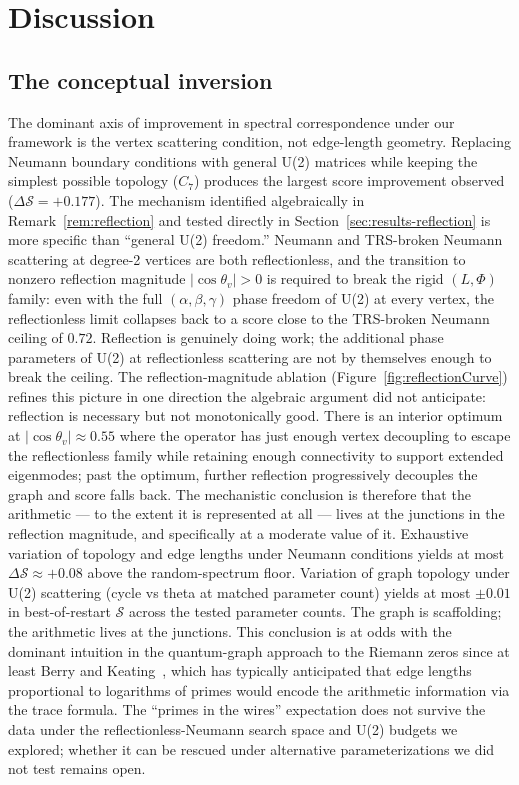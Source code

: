 \documentclass[cntp]{ipart}
\theoremstyle{plain}
\theoremstyle{remark}
\begin{document}
\section{Discussion}
\label{sec:discussion}

\subsection{The conceptual inversion}
\label{sec:disc-inversion}

The dominant axis of improvement in spectral correspondence under our framework is the vertex scattering condition, not edge-length geometry. Replacing Neumann boundary conditions with general U(2) matrices while keeping the simplest possible topology ($C_7$) produces the largest score improvement observed ($\Delta\mathcal{S} = +0.177$). The mechanism identified algebraically in Remark~\ref{rem:reflection} and tested directly in Section~\ref{sec:results-reflection} is more specific than ``general U(2) freedom.'' Neumann and TRS-broken Neumann scattering at degree-2 vertices are both reflectionless, and the transition to nonzero reflection magnitude $|\cos\theta_v| > 0$ is required to break the rigid $(L, \Phi)$ family: even with the full $(\alpha, \beta, \gamma)$ phase freedom of U(2) at every vertex, the reflectionless limit collapses back to a score close to the TRS-broken Neumann ceiling of $0.72$. Reflection is genuinely doing work; the additional phase parameters of U(2) at reflectionless scattering are not by themselves enough to break the ceiling. The reflection-magnitude ablation (Figure~\ref{fig:reflectionCurve}) refines this picture in one direction the algebraic argument did not anticipate: reflection is necessary but not monotonically good. There is an interior optimum at $|\cos\theta_v| \approx 0.55$ where the operator has just enough vertex decoupling to escape the reflectionless family while retaining enough connectivity to support extended eigenmodes; past the optimum, further reflection progressively decouples the graph and score falls back. The mechanistic conclusion is therefore that the arithmetic --- to the extent it is represented at all --- lives at the junctions in the reflection magnitude, and specifically at a moderate value of it. Exhaustive variation of topology and edge lengths under Neumann conditions yields at most $\Delta\mathcal{S} \approx +0.08$ above the random-spectrum floor. Variation of graph topology under U(2) scattering (cycle vs theta at matched parameter count) yields at most $\pm 0.01$ in best-of-restart $\mathcal{S}$ across the tested parameter counts. The graph is scaffolding; the arithmetic lives at the junctions. This conclusion is at odds with the dominant intuition in the quantum-graph approach to the Riemann zeros since at least Berry and Keating~\cite{r5}, which has typically anticipated that edge lengths proportional to logarithms of primes would encode the arithmetic information via the trace formula. The ``primes in the wires'' expectation does not survive the data under the reflectionless-Neumann search space and U(2) budgets we explored; whether it can be rescued under alternative parameterizations we did not test remains open.
\end{document}
